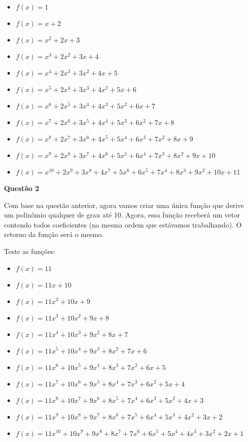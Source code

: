 \documentclass[12pt, a4paper]{article}
\begin{document}
\begin{itemize}
	\item $f(x) = 1$
	\item $f(x) = x + 2$
	\item $f(x) = x^2 + 2x + 3$
	\item $f(x) = x^3 + 2x^2 + 3x + 4$
	\item $f(x) = x^4 + 2x^3 + 3x^2 + 4x + 5$
	\item $f(x) = x^5 + 2x^4 + 3x^3 + 4x^2 + 5x + 6$
	\item $f(x) = x^6 + 2x^5 + 3x^4 + 4x^3 + 5x^2 + 6x + 7$
	\item $f(x) = x^7 + 2x^6 + 3x^5 + 4x^4 + 5x^3 + 6x^2 + 7x + 8$
	\item $f(x) = x^8 + 2x^7 + 3x^6 + 4x^5 + 5x^4 + 6x^3 + 7x^2 + 8x + 9$
	\item $f(x) = x^9 + 2x^8 + 3x^7 + 4x^6 + 5x^5 + 6x^4 + 7x^3 + 8x^2 + 9x + 10$
	\item $f(x) = x^{10} + 2x^9 + 3x^8 + 4x^7 + 5x^6 + 6x^5 + 7x^4 + 8x^3 + 9x^2 + 10x + 11$
\end{itemize}


\textbf{Questão 2}

Com base na questão anterior, agora vamos criar uma única função que derive um polinômio qualquer de grau até 10. Agora, essa função receberá um vetor contendo todos coeficientes (na mesma ordem que estávamos trabalhando). O retorno da função será o mesmo.

Teste as funções:

\begin{itemize}
	\item $f(x) = 11$
	\item $f(x) = 11x + 10$
	\item $f(x) = 11x^2 + 10x + 9$
	\item $f(x) = 11x^3 + 10x^2 + 9x + 8$
	\item $f(x) = 11x^4 + 10x^3 + 9x^2 + 8x + 7$
	\item $f(x) = 11x^5 + 10x^4 + 9x^3 + 8x^2 + 7x + 6$
	\item $f(x) = 11x^6 + 10x^5 + 9x^4 + 8x^3 + 7x^2 + 6x + 5$
	\item $f(x) = 11x^7 + 10x^6 + 9x^5 + 8x^4 + 7x^3 + 6x^2 + 5x + 4$
	\item $f(x) = 11x^8 + 10x^7 + 9x^6 + 8x^5 + 7x^4 + 6x^3 + 5x^2 + 4x + 3$
	\item $f(x) = 11x^9 + 10x^8 + 9x^7 + 8x^6 + 7x^5 + 6x^4 + 5x^3 + 4x^2 + 3x + 2$
	\item $f(x) = 11x^{10} + 10x^9 + 9x^8 + 8x^7 + 7x^6 + 6x^5 + 5x^4 + 4x^3 + 3x^2 + 2x + 1$
\end{itemize}

	
	
\end{document}
